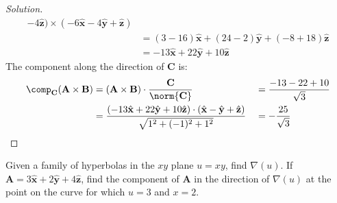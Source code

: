 \documentclass[crop=false,class=article,oneside]{standalone}
\begin{document}
\begin{proof}[Solution]
\begin{align*}
                -4\hat{\mathbf{z}})
                \times
                (-6\hat{\mathbf{x}}
                -4\hat{\mathbf{y}}
                +\hat{\mathbf{z}})\\
                &=
                (3-16)\hat{\mathbf{x}}
                +(24-2)\hat{\mathbf{y}}
                +(-8+18)\hat{\mathbf{z}}\\
                &=
                -13\hat{\mathbf{x}}
                +22\hat{\mathbf{y}}
                +10\hat{\mathbf{z}}
            \end{align*}
            The component along the direction
            of $\mathbf{C}$ is:
            \begin{align*}
                \comp_{\mathbf{C}}(\mathbf{A}\times\mathbf{B})
                &=
                (\mathbf{A}\times\mathbf{B})
                \cdot
                \frac{\mathbf{C}}{\norm{\mathbf{C}}}
                &
                &=\frac{-13-22+10}{\sqrt{3}}\\
                &=
                \frac{(-13\hat{\mathbf{x}}
                +22\hat{\mathbf{y}}
                +10\hat{\mathbf{z}})
                \cdot
                (\hat{\mathbf{x}}
                -\hat{\mathbf{y}}
                +\hat{\mathbf{z}})}
                {\sqrt{1^2+(-1)^2+1^2}}
                &
                &=-\frac{25}{\sqrt{3}}
            \end{align*}
        \end{proof}
        \begin{problem}[Wangsness 1-8]
            Given a family of hyperbolas in the $xy$
            plane $u=xy$, find $\nabla(u)$.
            If
            $\mathbf{A}%
             =3\hat{\mathbf{x}}%
             +2\hat{\mathbf{y}}%
             +4\hat{\mathbf{z}}$,
            find the component of $\mathbf{A}$
            in the direction of $\nabla(u)$ at
            the point on the curve for which $u=3$ and $x=2$.
        \end{problem}
\end{document}
